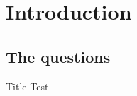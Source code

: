 \documentclass[xcolor={dvipsnames}]{beamer}
\begin{document}
\section{Introduction}
\subsection{The questions}
\begin{frame}{Title}
Test
\end{frame}
\end{document}
